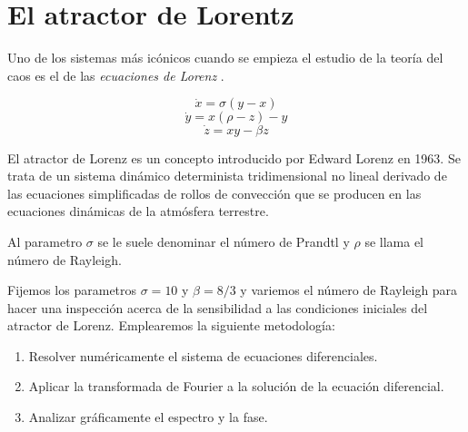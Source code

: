 \section{El atractor de Lorentz}
\label{El atractor de Lorentz}

Uno de los sistemas más icónicos cuando se empieza el estudio de la teoría del caos es el de las
\emph{ecuaciones de Lorenz} .

\begin{definition}
    \begin{equation}
        \dot{x} = \sigma (y-x)
    \end{equation}
    \begin{equation}
        \dot{y} = x(\rho - z) - y
    \end{equation}
    \begin{equation}
        \dot{z} = xy - \beta z
    \end{equation}
\end{definition}

El atractor de Lorenz es un concepto introducido por Edward Lorenz en 1963. Se trata de un sistema dinámico
determinista tridimensional no lineal derivado de las ecuaciones simplificadas de rollos de convección que
se producen en las ecuaciones dinámicas de la atmósfera terrestre.

Al parametro $\sigma$ se le suele denominar el número de Prandtl y $\rho$ se llama el número de Rayleigh.

Fijemos los parametros $\sigma = 10$ y $\beta = 8/3$ y variemos el número de Rayleigh para hacer una inspección
acerca de la sensibilidad a las condiciones iniciales del atractor de Lorenz. Emplearemos la siguiente metodología:

\begin{enumerate}
    \item Resolver numéricamente el sistema de ecuaciones diferenciales.
    \item Aplicar la transformada de Fourier a la solución de la ecuación diferencial.
    \item Analizar gráficamente el espectro y la fase.
\end{enumerate}

